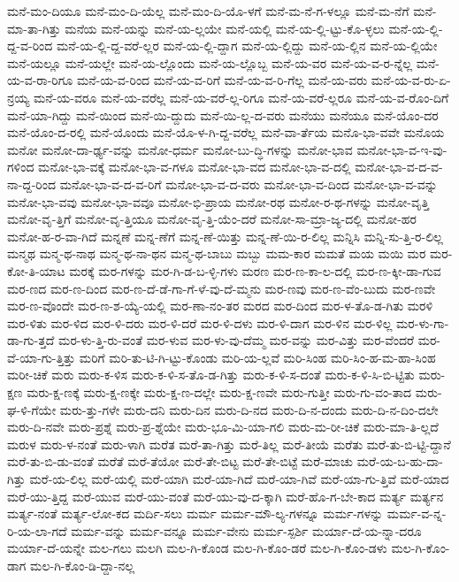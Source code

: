 {ಮನೆ-ಮಂ-ದಿಯೂ
ಮನೆ-ಮಂ-ದಿ-ಯೆಲ್ಲ
ಮನೆ-ಮಂ-ದಿ-ಯೊ-ಳಗೆ
ಮನೆ-ಮ-ನೆ-ಗ-ಳಲ್ಲೂ
ಮನೆ-ಮ-ನೆಗೆ
ಮನೆ-ಮಾ-ತಾ-ಗಿತ್ತು
ಮನೆಯ
ಮನೆ-ಯನ್ನು
ಮನೆ-ಯ-ಲ್ಲಯೇ
ಮನೆ-ಯಲ್ಲಿ
ಮನೆ-ಯ-ಲ್ಲಿ-ಟ್ಟು-ಕೊ-ಳ್ಳಲು
ಮನೆ-ಯ-ಲ್ಲಿ-ದ್ದ-ವ-ರಿಂದ
ಮನೆ-ಯ-ಲ್ಲಿ-ದ್ದ-ವರೆ-ಲ್ಲರ
ಮನೆ-ಯ-ಲ್ಲಿ-ದ್ದಾಗ
ಮನೆ-ಯ-ಲ್ಲಿದ್ದು
ಮನೆ-ಯ-ಲ್ಲಿನ
ಮನೆ-ಯ-ಲ್ಲಿಯೇ
ಮನೆ-ಯಲ್ಲೂ
ಮನೆ-ಯಲ್ಲೇ
ಮನೆ-ಯ-ಲ್ಲೊಂದು
ಮನೆ-ಯ-ಲ್ಲೊಬ್ಬ
ಮನೆ-ಯ-ವರ
ಮನೆ-ಯ-ವ-ರ-ನ್ನೆಲ್ಲ
ಮನೆ-ಯ-ವ-ರಾ-ರಿಗೂ
ಮನೆ-ಯ-ವ-ರಿಂದ
ಮನೆ-ಯ-ವ-ರಿಗೆ
ಮನೆ-ಯ-ವ-ರಿ-ಗೆಲ್ಲ
ಮನೆ-ಯ-ವರು
ಮನೆ-ಯ-ವ-ರು-ಏ-ನ್ರಯ್ಯ
ಮನೆ-ಯ-ವರೂ
ಮನೆ-ಯ-ವರೆಲ್ಲ
ಮನೆ-ಯ-ವರೆ-ಲ್ಲ-ರಿಗೂ
ಮನೆ-ಯ-ವರೆ-ಲ್ಲರೂ
ಮನೆ-ಯ-ವ-ರೊಂ-ದಿಗೆ
ಮನೆ-ಯಾ-ಗಿದ್ದು
ಮನೆ-ಯಿಂದ
ಮನೆ-ಯಿ-ದ್ದುದು
ಮನೆ-ಯಿ-ಲ್ಲ-ದ-ವರು
ಮನೆಯು
ಮನೆಯೂ
ಮನೆ-ಯೊಂ-ದರ
ಮನೆ-ಯೊಂ-ದ-ರಲ್ಲಿ
ಮನೆ-ಯೊಂದು
ಮನೆ-ಯೊ-ಳ-ಗಿ-ದ್ದ-ವರೆಲ್ಲ
ಮನೆ-ವಾ-ರ್ತೆಯ
ಮನೊ-ಭಾ-ವವೇ
ಮನೊಯ
ಮನೋ
ಮನೋ-ದಾ-ರ್ಢ್ಯ-ವನ್ನು
ಮನೋ-ಧರ್ಮ
ಮನೋ-ಬು-ದ್ಧಿ-ಗಳನ್ನು
ಮನೋ-ಭಾವ
ಮನೋ-ಭಾ-ವ-ಇ-ವು-ಗಳಿಂದ
ಮನೋ-ಭಾ-ವಕ್ಕೆ
ಮನೋ-ಭಾ-ವ-ಗಳೂ
ಮನೋ-ಭಾ-ವದ
ಮನೋ-ಭಾ-ವ-ದಲ್ಲಿ
ಮನೋ-ಭಾ-ವ-ದ-ವ-ನಾ-ದ್ದ-ರಿಂದ
ಮನೋ-ಭಾ-ವ-ದ-ವ-ರಿಗೆ
ಮನೋ-ಭಾ-ವ-ದ-ವರು
ಮನೋ-ಭಾ-ವ-ದಿಂದ
ಮನೋ-ಭಾ-ವ-ವನ್ನು
ಮನೋ-ಭಾ-ವವು
ಮನೋ-ಭಾ-ವವೂ
ಮನೋ-ಭಿ-ಪ್ರಾಯ
ಮನೋ-ರಥ
ಮನೋ-ರ-ಥ-ಗಳನ್ನು
ಮನೋ-ವೃತ್ತಿ
ಮನೋ-ವೃ-ತ್ತಿಗೆ
ಮನೋ-ವೃ-ತ್ತಿಯೂ
ಮನೋ-ವೃ-ತ್ತಿ-ಯೆಂ-ದರೆ
ಮನೋ-ಸಾ-ಮ್ರಾ-ಜ್ಯ-ದಲ್ಲಿ
ಮನೋ-ಹರ
ಮನೋ-ಹ-ರ-ವಾ-ಗಿದೆ
ಮನ್ನಣೆ
ಮನ್ನ-ಣೆಗೆ
ಮನ್ನ-ಣೆ-ಯಿತ್ತು
ಮನ್ನ-ಣೆ-ಯಿ-ರ-ಲಿಲ್ಲ
ಮನ್ನಿಸಿ
ಮನ್ನಿ-ಸು-ತ್ತಿ-ರ-ಲಿಲ್ಲ
ಮನ್ಮಥ
ಮನ್ಮ-ಥ-ನಾಥ
ಮನ್ಮ-ಥ-ನಾ-ಥನ
ಮನ್ಮ-ಥ-ಬಾಬು
ಮಬ್ಬು
ಮಮ-ಕಾರ
ಮಮತೆ
ಮಯ
ಮಯಿ
ಮರ
ಮರ-ಕೋ-ತಿ-ಯಾಟ
ಮರಕ್ಕೆ
ಮರ-ಗಳನ್ನು
ಮರ-ಗಿ-ಡ-ಬ-ಳ್ಳಿ-ಗಳು
ಮರಣ
ಮರ-ಣ-ಕಾ-ಲ-ದಲ್ಲಿ
ಮರ-ಣ-ಕ್ಕೀ-ಡಾ-ಗುವ
ಮರ-ಣದ
ಮರ-ಣ-ದಿಂದ
ಮರ-ಣ-ದೆ-ಡೆ-ಗಾ-ಗೆ-ಳೆ-ವು-ದೆ-ಮ್ಮನು
ಮರ-ಣವು
ಮರ-ಣ-ವೆಂ-ಬುದು
ಮರ-ಣವೇ
ಮರ-ಣ-ವೊಂದೇ
ಮರ-ಣ-ಶ-ಯ್ಯೆ-ಯಲ್ಲಿ
ಮರ-ಣಾ-ನಂ-ತರ
ಮರದ
ಮರ-ದಿಂದ
ಮರ-ಳ-ತೊ-ಡ-ಗಿತು
ಮರಳಿ
ಮರ-ಳಿತು
ಮರ-ಳಿದ
ಮರ-ಳಿ-ದರು
ಮರ-ಳಿ-ದರೆ
ಮರ-ಳಿ-ದಳು
ಮರ-ಳಿ-ದಾಗ
ಮರ-ಳಿನ
ಮರ-ಳಿಲ್ಲ
ಮರ-ಳು-ಗಾ-ಡಾ-ಗು-ತ್ತದೆ
ಮರ-ಳು-ತ್ತಿ-ರು-ವಂತೆ
ಮರ-ಳುವ
ಮರ-ಳು-ವು-ದೆಮ್ಮ
ಮರ-ವನ್ನು
ಮರ-ವಿತ್ತು
ಮರ-ವೆಂದರೆ
ಮರ-ವೆ-ಯಾ-ಗು-ತ್ತಿತ್ತು
ಮರಿಗೆ
ಮರಿ-ತು-ಟಿ-ಗಿ-ಟ್ಟು-ಕೊಂಡು
ಮರಿ-ಯ-ಲ್ಲವೆ
ಮರಿ-ಸಿಂಹ
ಮರಿ-ಸಿಂ-ಹ-ಮ-ಹಾ-ಸಿಂಹ
ಮರೀ-ಚಿಕೆ
ಮರು
ಮರು-ಕ-ಳಿಸ
ಮರು-ಕ-ಳಿ-ಸ-ತೊ-ಡ-ಗಿತ್ತು
ಮರು-ಕ-ಳಿ-ಸ-ದಂತೆ
ಮರು-ಕ-ಳಿ-ಸಿ-ಬಿ-ಟ್ಟಿತು
ಮರು-ಕ್ಷಣ
ಮರು-ಕ್ಷ-ಣಕ್ಕೆ
ಮರು-ಕ್ಷ-ಣಕ್ಕೇ
ಮರು-ಕ್ಷ-ಣ-ದಲ್ಲೇ
ಮರು-ಕ್ಷ-ಣವೇ
ಮರು-ಗುತ್ತೀ
ಮರು-ಗು-ವಂ-ತಾದ
ಮರು-ಘ-ಳಿ-ಗೆಯೇ
ಮರು-ತ್ತು-ಗಳೇ
ಮರು-ದನಿ
ಮರು-ದಿನ
ಮರು-ದಿ-ನದ
ಮರು-ದಿ-ನ-ದಂದು
ಮರು-ದಿ-ನ-ದಿಂ-ದಲೇ
ಮರು-ದಿ-ನವೇ
ಮರು-ಪ್ರಶ್ನೆ
ಮರು-ಪ್ರ-ಶ್ನೆಯೇ
ಮರು-ಭೂ-ಮಿ-ಯಾ-ಗಲಿ
ಮರು-ಮ-ರೀ-ಚಿಕೆ
ಮರು-ಮಾ-ತಿ-ಲ್ಲದೆ
ಮರುಳ
ಮರು-ಳ-ನಂತೆ
ಮರು-ಳಾಗಿ
ಮರೆತ
ಮರೆ-ತಾ-ಗಿತ್ತು
ಮರೆ-ತಿಲ್ಲ
ಮರೆ-ತೀಯೆ
ಮರೆತು
ಮರೆ-ತು-ಬಿ-ಟ್ಟಿ-ದ್ದಾನೆ
ಮರೆ-ತು-ಬಿ-ಡು-ವಂತೆ
ಮರೆತೆ
ಮರೆ-ತೆಯೋ
ಮರೆ-ತೇ-ಬಿಟ್ಟ
ಮರೆ-ತೇ-ಬಿಟ್ಟೆ
ಮರೆ-ಮಾಚು
ಮರೆ-ಯ-ಬ-ಹು-ದಾ-ಗಿತ್ತು
ಮರೆ-ಯ-ಲಿಲ್ಲ
ಮರೆ-ಯಲ್ಲಿ
ಮರೆ-ಯಾಗಿ
ಮರೆ-ಯಾ-ಗಿದೆ
ಮರೆ-ಯಾ-ಗಿವೆ
ಮರೆ-ಯಾ-ಗು-ತ್ತಿವೆ
ಮರೆ-ಯಾದ
ಮರೆ-ಯು-ತ್ತಿದ್ದ
ಮರೆ-ಯುವ
ಮರೆ-ಯು-ವಂತೆ
ಮರೆ-ಯು-ವು-ದ-ಕ್ಕಾಗಿ
ಮರೆ-ಹೊ-ಗ-ಬೇ-ಕಾದ
ಮರ್ತ್ಯ
ಮರ್ತ್ಯನ
ಮರ್ತ್ಯ-ನಂತೆ
ಮರ್ತ್ಯ-ಲೋ-ಕದ
ಮರ್ದಿ-ಸಲು
ಮರ್ಮ
ಮರ್ಮ-ಮೌ-ಲ್ಯ-ಗಳನ್ನೂ
ಮರ್ಮ-ಗಳನ್ನು
ಮರ್ಮ-ವ-ನ್ನ-ರಿ-ಯ-ಲಾ-ಗದೆ
ಮರ್ಮ-ವನ್ನು
ಮರ್ಮ-ವನ್ನೂ
ಮರ್ಮ-ವೇನು
ಮರ್ಮ-ಸ್ಪರ್ಶಿ
ಮರ್ಯಾ-ದೆ-ಯ-ನ್ನಾ-ದರೂ
ಮರ್ಯಾ-ದೆ-ಯನ್ನೇ
ಮಲ-ಗಲು
ಮಲಗಿ
ಮಲ-ಗಿ-ಕೊಂಡ
ಮಲ-ಗಿ-ಕೊಂ-ಡರೆ
ಮಲ-ಗಿ-ಕೊಂ-ಡಳು
ಮಲ-ಗಿ-ಕೊಂ-ಡಾಗ
ಮಲ-ಗಿ-ಕೊಂ-ಡಿ-ದ್ದಾ-ನಲ್ಲ
}
